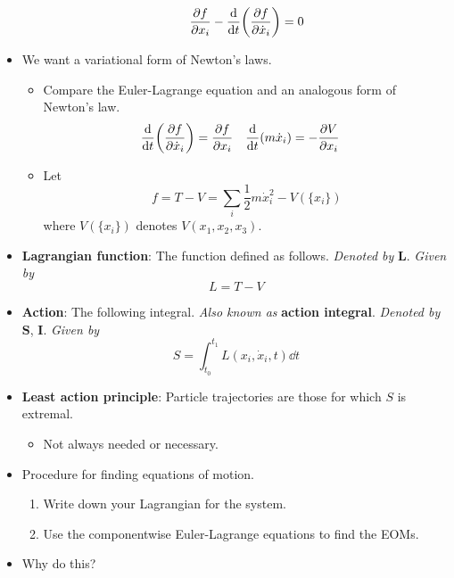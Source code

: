 \documentclass[../notes.tex]{subfiles}
\begin{document}
\begin{itemize}
\begin{itemize}
\begin{equation*}
            \pdv{f}{x_i}-\dv{t}(\pdv{f}{\dot{x}_i}) = 0
        \end{equation*}
    \end{itemize}
    \item We want a variational form of Newton's laws.
    \begin{itemize}
        \item Compare the Euler-Lagrange equation and an analogous form of Newton's law.
        \begin{align*}
            \dv{t}(\pdv{f}{\dot{x}_i}) &= \pdv{f}{x_i}&
            \dv{t}(m\dot{x}_i) &= -\pdv{V}{x_i}
        \end{align*}
        \item Let
        \begin{equation*}
            f = T-V
            = \sum_i\frac{1}{2}m\dot{x}_i^2-V(\{x_i\})
        \end{equation*}
        where $V(\{x_i\})$ denotes $V(x_1,x_2,x_3)$.
    \end{itemize}
    \item \textbf{Lagrangian function}: The function defined as follows. \emph{Denoted by} $\bm{L}$. \emph{Given by}
    \begin{equation*}
        L = T-V
    \end{equation*}
    \item \textbf{Action}: The following integral. \emph{Also known as} \textbf{action integral}. \emph{Denoted by} $\bm{S}$, $\bm{I}$. \emph{Given by}
    \begin{equation*}
        S = \int_{t_0}^{t_1}L(x_i,\dot{x}_i,t)\dd{t}
    \end{equation*}
    \item \textbf{Least action principle}: Particle trajectories are those for which $S$ is extremal.
    \begin{itemize}
        \item Not always needed or necessary.
    \end{itemize}
    \item Procedure for finding equations of motion.
    \begin{enumerate}
        \item Write down your Lagrangian for the system.
        \item Use the componentwise Euler-Lagrange equations to find the EOMs.
    \end{enumerate}
    \item Why do this?
    \begin{enumerate}

\end{enumerate}
\end{itemize}
\end{document}
